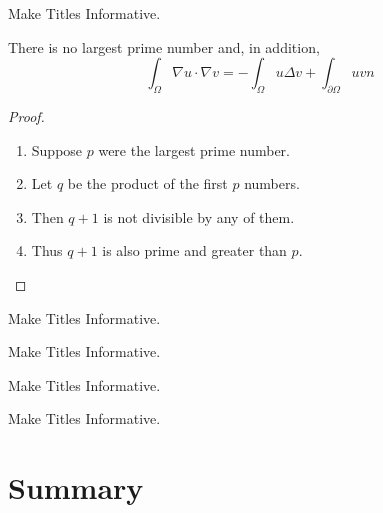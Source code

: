\documentclass[ucs,8pt]{beamer}
\begin{document}
\begin{frame}{Make Titles Informative.}
\begin{theorem}
 There is no largest prime number and, in addition, $$\int_\Omega \nabla u \cdot \nabla v = - \int_\Omega u \Delta v + \int_{\partial\Omega} u v n$$
 \end{theorem}
 \begin{proof}
 \begin{enumerate}
 \item<1-> Suppose $p$ were the largest prime number.
 \item<2-> Let $q$ be the product of the first $p$ numbers.
 \item<3-> Then $q + 1$ is not divisible by any of them.
 \item<1-> Thus $q + 1$ is also prime and greater than $p$.\qedhere
 \end{enumerate} 
 \end{proof}
\end{frame}

\begin{frame}{Make Titles Informative.}
\end{frame}



\begin{frame}{Make Titles Informative.}
\end{frame}

\begin{frame}{Make Titles Informative.}
\end{frame}

\begin{frame}{Make Titles Informative.}
\end{frame}



\section*{Summary}
\end{document}
